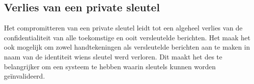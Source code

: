 \subsection{Verlies van een private sleutel}
\label{subsec:verlies-van-een-private-sleutel}
Het compromitteren van een private sleutel leidt tot een algeheel verlies van de
confidentialiteit van alle toekomstige en ooit versleutelde berichten. Het maak
het ook mogelijk om zowel handtekeningen als versleutelde berichten aan te maken
in naam van de identiteit wiens sleutel werd verloren. Dit maakt het des te
belangrijker om een systeem te hebben waarin sleutels kunnen worden
geïnvalideerd.
